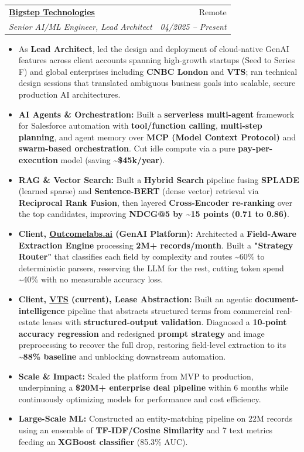 \documentclass[11pt,a4paper]{article}
\makeatletter
\newcommand{\resumeItem}[1]{
  \item\small{
    {#1 \vspace{-2pt}}
  }
}
\newcommand{\resumeSubheading}[4]{
  \vspace{-1pt}\item
    \begin{tabular*}{0.97\textwidth}[t]{l@{\extracolsep{\fill}}r}
      \textbf{#1} & #2 \\
      \textit{\small#3} & \textit{\small #4} \\
    \end{tabular*}\vspace{-5pt}
}
\newcommand{\resumeItemListStart}{\begin{itemize}[itemsep=2pt, topsep=0pt, partopsep=0pt]}
\newcommand{\resumeItemListEnd}{\end{itemize}\vspace{-5pt}}
\makeatother
\begin{document}
    \resumeSubheading
      {\href{https://bigsteptech.com/}{Bigstep Technologies}}{Remote}
      {Senior AI/ML Engineer, Lead Architect}{04/2025 -- Present}
      \resumeItemListStart
        \resumeItem{As \textbf{Lead Architect}, led the design and deployment of cloud-native GenAI features across client accounts spanning high-growth startups (Seed to Series F) and global enterprises including \textbf{CNBC London} and \textbf{VTS}; ran technical design sessions that translated ambiguous business goals into scalable, secure production AI architectures.}
        \resumeItem{\textbf{AI Agents \& Orchestration:} Built a \textbf{serverless multi-agent} framework for Salesforce automation with \textbf{tool/function calling}, \textbf{multi-step planning}, and agent memory over \textbf{MCP (Model Context Protocol)} and \textbf{swarm-based orchestration}. Cut idle compute via a pure \textbf{pay-per-execution} model (saving \textbf{\textasciitilde{}\$45k/year}).}
        \resumeItem{\textbf{RAG \& Vector Search:} Built a \textbf{Hybrid Search} pipeline fusing \textbf{SPLADE} (learned sparse) and \textbf{Sentence-BERT} (dense vector) retrieval via \textbf{Reciprocal Rank Fusion}, then layered \textbf{Cross-Encoder re-ranking} over the top candidates, improving \textbf{NDCG@5 by \textasciitilde{}15 points (0.71 to 0.86)}.}
        \resumeItem{\textbf{Client, \href{https://www.outcomelabs.ai/}{Outcomelabs.ai} (GenAI Platform):} Architected a \textbf{Field-Aware Extraction Engine} processing \textbf{2M+ records/month}. Built a \textbf{"Strategy Router"} that classifies each field by complexity and routes \textasciitilde{}60\% to deterministic parsers, reserving the LLM for the rest, cutting token spend \textasciitilde{}40\% with no measurable accuracy loss.}
        \resumeItem{\textbf{Client, \href{https://www.vts.com/}{VTS} (current), Lease Abstraction:} Built an agentic \textbf{document-intelligence} pipeline that abstracts structured terms from commercial real-estate leases with \textbf{structured-output validation}. Diagnosed a \textbf{10-point accuracy regression} and redesigned \textbf{prompt strategy} and image preprocessing to recover the full drop, restoring field-level extraction to its \textbf{\textasciitilde{}88\% baseline} and unblocking downstream automation.}
        \resumeItem{\textbf{Scale \& Impact:} Scaled the platform from MVP to production, underpinning a \textbf{\$20M+ enterprise deal pipeline} within 6 months while continuously optimizing models for performance and cost efficiency.}
        \resumeItem{\textbf{Large-Scale ML:} Constructed an entity-matching pipeline on 22M records using an ensemble of \textbf{TF-IDF/Cosine Similarity} and 7 text metrics feeding an \textbf{XGBoost classifier} (85.3\% AUC).}
      \resumeItemListEnd
\end{document}
